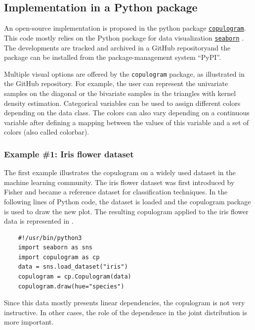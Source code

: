 \subsection{Implementation in a Python package}

An open-source implementation is proposed in the python package \href{https://github.com/efekhari27/copulogram}{\texttt{copulogram}}. 
This code mostly relies on the Python package for data visualization \href{https://seaborn.pydata.org/}{\texttt{seaborn}} \citep{waskom_2021_seaborn}. 
The developments are tracked and archived in a GitHub repository\footnotemark and the package can be installed from the package-management system ``PyPI''. 

Multiple visual options are offered by the \texttt{copulogram} package, as illustrated in the GitHub repository. 
For example, the user can represent the univariate samples on the diagonal or the bivariate samples in the triangles with kernel density estimation.  
Categorical variables can be used to assign different colors depending on the data class. 
The colors can also vary depending on a continuous variable after defining a mapping between the values of this variable and a set of colors (also called colorbar).






\subsubsection{Example \#1: Iris flower dataset}

The first example illustrates the copulogram on a widely used dataset in the machine learning community. 
The iris flower dataset was first introduced by Fisher and became a reference dataset for classification techniques. 
In the following lines of Python code, the dataset is loaded and the copulogram package is used to draw the new plot. 
The resulting copulogram applied to the iris flower data is represented in . 
\lstset{style=mystyle, language=python}
%
\begin{lstlisting}
    #!/usr/bin/python3        
    import seaborn as sns
    import copulogram as cp
    data = sns.load_dataset("iris")
    copulogram = cp.Copulogram(data)
    copulogram.draw(hue="species")
\end{lstlisting}
%
Since this data mostly presents linear dependencies, the copulogram is not very instructive. 
In other cases, the role of the dependence in the joint distribution is more important.




